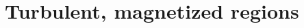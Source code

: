 \documentclass[presentation]{beamer}
\begin{document}
\section{Turbulent, magnetized \hii{} regions}



\end{document}
